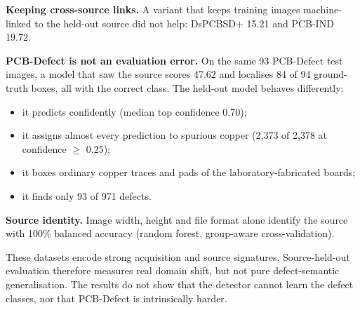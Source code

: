 \documentclass[11pt]{article}
\begin{document}
\textbf{Keeping cross-source links.} A variant that keeps training images machine-linked to the held-out source did not help: DsPCBSD+ 15.21 and PCB-IND 19.72.

\textbf{PCB-Defect is not an evaluation error.} On the same 93 PCB-Defect test images, a model that saw the source scores 47.62 and localises 84 of 94 ground-truth boxes, all with the correct class. The held-out model behaves differently:

\begin{itemize}
\item it predicts confidently (median top confidence 0.70);
\item it assigns almost every prediction to spurious copper (2,373 of 2,378 at confidence $\geq$ 0.25);
\item it boxes ordinary copper traces and pads of the laboratory-fabricated boards;
\item it finds only 93 of 971 defects.
\end{itemize}
\textbf{Source identity.} Image width, height and file format alone identify the source with 100\% balanced accuracy (random forest, group-aware cross-validation).

These datasets encode strong acquisition and source signatures. Source-held-out evaluation therefore measures real domain shift, but not pure defect-semantic generalisation. The results do not show that the detector cannot learn the defect classes, nor that PCB-Defect is intrinsically harder.
\end{document}

